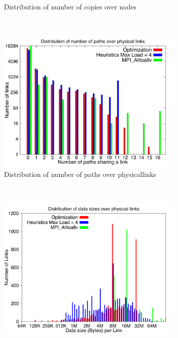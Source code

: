 \begin{figure}[!htbp]
\begin{subfigure}[b]{0.49\textwidth}
                \caption{Distribution of number of copies over nodes}
                \label{fig:3_2048_copy}
        \end{subfigure}
        ~ %
        \begin{subfigure}[b]{0.49\textwidth}
                \includegraphics[width=\textwidth]{report_figures/constantr/3_2048/loadpath_histo.pdf}
                \caption{Distribution of number of paths over physicallinks}
                \label{fig:3_2048_loadpath}
        \end{subfigure}
        ~ %
        \begin{subfigure}[b]{0.49\textwidth}
                \includegraphics[width=\textwidth]{report_figures/constantr/3_2048/loaddata_histo.pdf}

\end{subfigure}
\end{figure}
